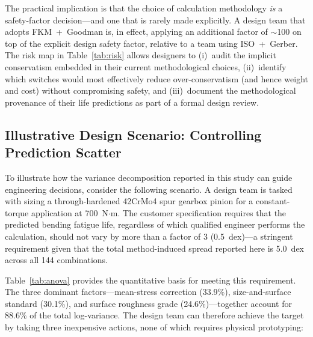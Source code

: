 \documentclass[12pt,a4paper]{article}
\begin{document}
The practical implication is that the choice of calculation methodology
\emph{is} a safety-factor decision---and one that is rarely made
explicitly. A design team that adopts FKM~+~Goodman is, in effect,
applying an additional factor of $\sim$100 on top of the explicit
design safety factor, relative to a team using ISO~+~Gerber. The
risk map in Table~\ref{tab:risk} allows designers to (i)~audit the
implicit conservatism embedded in their current methodological choices,
(ii)~identify which switches would most effectively reduce
over-conservatism (and hence weight and cost) without compromising
safety, and (iii)~document the methodological provenance of their life
predictions as part of a formal design review.

\subsection{Illustrative Design Scenario: Controlling Prediction Scatter}

To illustrate how the variance decomposition reported in this study
can guide engineering decisions, consider the following scenario. A
design team is tasked with sizing a through-hardened 42CrMo4 spur
gearbox pinion for a constant-torque application at 700~N$\cdot$m.
The customer specification requires that the predicted bending fatigue
life, regardless of which qualified engineer performs the calculation,
should not vary by more than a factor of 3 (0.5~dex)---a stringent
requirement given that the total method-induced spread reported here is
5.0~dex across all 144 combinations.

Table~\ref{tab:anova} provides the quantitative basis for meeting this
requirement. The three dominant factors---mean-stress correction
(33.9\%), size-and-surface standard (30.1\%), and surface roughness
grade (24.6\%)---together account for 88.6\% of the total
log-variance. The design team can therefore achieve the target by
taking three inexpensive actions, none of which requires physical
prototyping:
\end{document}
